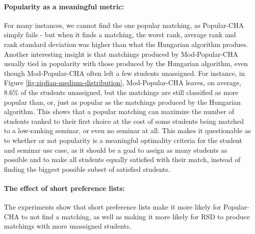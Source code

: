 \paragraph{Popularity as a meaningful metric:} For many instances, we cannot find the one popular matching, as Popular-CHA simply fails - but when it finds a matching, the worst rank, average rank and rank standard deviation was higher than what the Hungarian algorithm produes. Another interesting insight is that matchings produced by Mod-Popular-CHA usually tied in popularity with those produced by the Hungarian algorithm, even though Mod-Popular-CHA often left a few students unassigned. For instance, in Figure \ref{fig:zipfian-medium-distribution}, Mod-Popular-CHA leaves, on average, 8.6\% of the students unassigned, but the matchings are still classified as more popular than, or, just as popular as the matchings produced by the Hungarian algorithm. This shows that a popular matching can maximize the number of students ranked to their first choice at the cost of some students being matched to a low-ranking seminar, or even no seminar at all. This makes it questionable as to whether or not popularity is a meaningful optimality criteria for the student and seminar use case, as it should be a goal to assign as many students as possible and to make all students equally satisfied with their match, instead of finding the biggest possible subset of satisfied students.
\paragraph{The effect of short preference lists:} The experiments show that short preference lists make it more likely for Popular-CHA to not find a matching, as well as making it more likely for RSD to produce matchings with more unassigned students.

